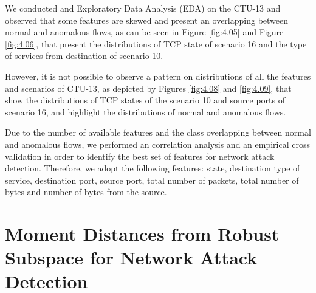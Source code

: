 We conducted and Exploratory Data Analysis (EDA) on the CTU-13 and observed that some features are skewed and present an overlapping between normal and anomalous flows, as can be seen in Figure \ref{fig:4.05} and Figure \ref{fig:4.06}, that present the distributions of TCP state of scenario 16 and the type of services from destination of scenario 10.

\begin{figure}[!htb]
\end{figure}

However, it is not possible to observe a pattern on distributions of all the features and scenarios of CTU-13, as depicted by Figures \ref{fig:4.08} and \ref{fig:4.09}, that show the distributions of TCP states of the scenario 10 and source ports of scenario 16, and highlight the distributions of normal and anomalous flows.

\begin{figure}[!htb]
\end{figure}

Due to the number of available features and the class overlapping between normal and anomalous flows, we performed an correlation analysis and an empirical cross validation in order to identify the best set of features for network attack detection. Therefore, we adopt the following features: state, destination type of service, destination port, source port, total number of packets, total number of bytes and number of bytes from the source.


\section{Moment Distances from Robust Subspace for Network Attack Detection}
\label{sec:4_proposal}


